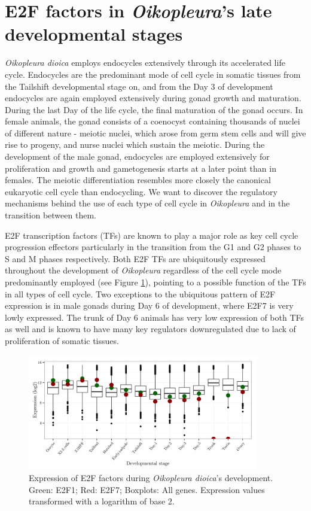 \documentclass[11pt,twoside,a4paper]{report}
\begin{document}
\section{E2F factors in \textit{Oikopleura}'s late developmental stages}
	\textit{Oikopleura dioica} employs endocycles extensively through its accelerated life cycle. Endocycles are the predominant mode of cell cycle in somatic tissues from the Tailshift developmental stage on, and from the Day 3 of development endocycles are again employed extensively during gonad growth and maturation. During the last Day of the life cycle, the final maturation of the gonad occurs. In female animals, the gonad consists of a coenocyst containing thousands of nuclei of different nature - meiotic nuclei, which arose from germ stem cells and will give rise to progeny, and nurse nuclei which sustain the meiotic. During the development of the male gonad, endocycles are employed extensively for proliferation and growth and gametogenesis starts at a later point than in females. The meiotic differentiation resembles more closely the canonical eukaryotic cell cycle than endocycling. We want to discover the regulatory mechanisms behind the use of each type of cell cycle in \textit{Oikopleura} and in the transition between them.
	
	E2F transcription factors (TFs) are known to play a major role as key cell cycle progression effectors particularly in the transition from the G1 and G2 phases to S and M phases respectively. Both E2F TFs are ubiquitously expressed throughout the development of \textit{Oikopleura} regardless of the cell cycle mode predominantly employed (see Figure \ref{fig:E2F_expression}), pointing to a possible function of the TFs in all types of cell cycle. Two exceptions to the ubiquitous pattern of E2F expression is in male gonads during Day 6 of development, where E2F7 is very lowly expressed. The trunk of Day 6 animals has very low expression of both TFs as well and is known to have many key regulators downregulated due to lack of proliferation of somatic tissues.
	
	\begin{figure}[here]
		\setlength{\belowcaptionskip}{5pt}
		\centering
		\includegraphics[width=0.9\textwidth]{pngs/E2F_expression_+allgenes.png}
		\caption{Expression of E2F factors during \textit{Oikopleura dioica}'s development.
			{
				\footnotesize
					Green: E2F1;
					Red: E2F7;
					Boxplots: All genes.
					Expression values transformed with a logarithm of base 2.
			}
		}
		\label{fig:E2F_expression}
	\end{figure}
	
\end{document}
